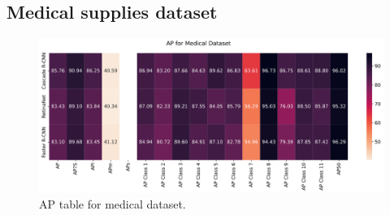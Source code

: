\subsection{Medical supplies dataset}

\begin{figure}[H]
	\includegraphics[width=\linewidth]{Sources/Figures/medical_ap_heatmap.png}
	\caption{AP table for medical dataset.}
\end{figure}

